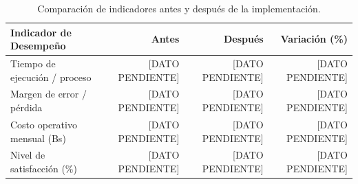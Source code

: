 \begin{table}[htbp]
    \centering
    \caption{Comparación de indicadores antes y después de la implementación.}
    \label{tab:comparacion_antes_despues}
    \begin{tabular}{lrrr}
        \toprule
        \textbf{Indicador de Desempeño} & \textbf{Antes} & \textbf{Después} & \textbf{Variación (\%)} \\
        \midrule
        Tiempo de ejecución / proceso  & [DATO PENDIENTE] & [DATO PENDIENTE] & [DATO PENDIENTE] \\
        Margen de error / pérdida       & [DATO PENDIENTE] & [DATO PENDIENTE] & [DATO PENDIENTE] \\
        Costo operativo mensual (Bs)    & [DATO PENDIENTE] & [DATO PENDIENTE] & [DATO PENDIENTE] \\
        Nivel de satisfacción (\%)      & [DATO PENDIENTE] & [DATO PENDIENTE] & [DATO PENDIENTE] \\
        \bottomrule
    \end{tabular}
\end{table}
